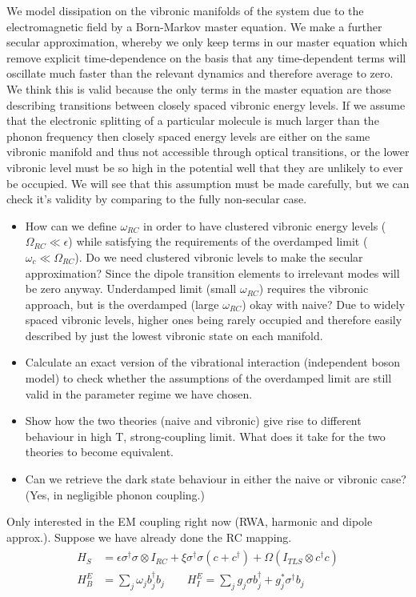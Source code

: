 \documentclass[]{article}
\begin{document}
We model dissipation on the vibronic manifolds of the system due to the electromagnetic field by a Born-Markov master equation. We make a further secular approximation, whereby we only keep terms in our master equation which remove explicit time-dependence on the basis that any time-dependent terms will oscillate much faster than the relevant dynamics and therefore average to zero. We think this is valid because the only terms in the master equation are those describing transitions between closely spaced vibronic energy levels. If we assume that the electronic splitting of a particular molecule is much larger than the phonon frequency then closely spaced energy levels are either on the same vibronic manifold and thus not accessible through optical transitions, or the lower vibronic level must be so high in the potential well that they are unlikely to ever be occupied. We will see that this assumption must be made carefully, but we can check it's validity by comparing to the fully non-secular case.
\begin{itemize}
	\item How can we define $\omega_{RC}$ in order to have clustered vibronic energy levels ($\Omega_{RC}\ll \epsilon$) while satisfying the requirements of the overdamped limit ($\omega_{c} \ll \Omega_{RC}$). Do we need clustered vibronic levels to make the secular approximation? Since the dipole transition elements to irrelevant modes will be zero anyway. Underdamped limit (small $\omega_{RC}$) requires the vibronic approach, but is the overdamped (large $\omega_{RC}$) okay with naive? Due to widely spaced vibronic levels, higher ones being rarely occupied and therefore easily described by just the lowest vibronic state on each manifold.
	\item Calculate an exact version of the vibrational interaction (independent boson model) to check whether the assumptions of the overdamped limit are still valid in the parameter regime we have chosen.
	\item Show how the two theories (naive and vibronic) give rise to different behaviour in high T, strong-coupling limit. What does it take for the two theories to become equivalent.
	\item Can  we retrieve the dark state behaviour in either the naive or vibronic case? (Yes, in negligible phonon coupling.)
\end{itemize}
Only interested in the EM coupling right now (RWA, harmonic and dipole approx.). Suppose we have already done the RC mapping.
\begin{align}
\begin{split}
H_S &= \epsilon \sigma^{\dagger}\sigma\otimes I_{RC} + \xi\sigma^{\dagger}\sigma(c + c^{\dagger}) + \Omega ( I_{TLS}\otimes c^{\dagger}c) \\
H_B^{E} &= \sum_{j}\omega_j b^{\dagger}_j b_j \quad \quad H_I^{E} = \sum_{j}g_j\sigma b^{\dagger}_j+ g_j^*\sigma^{\dagger} b_j 
\end{split}
\end{align}
\end{document}
